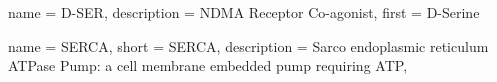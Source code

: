 %
%
%

{
	name        = {D-SER},
	description = {NDMA Receptor Co-agonist},
	first       = {D-Serine}
}

{
	name        = {SERCA},
	short       = {SERCA},
	description = {Sarco endoplasmic reticulum ATPase Pump: a cell membrane embedded pump requiring ATP},
}
